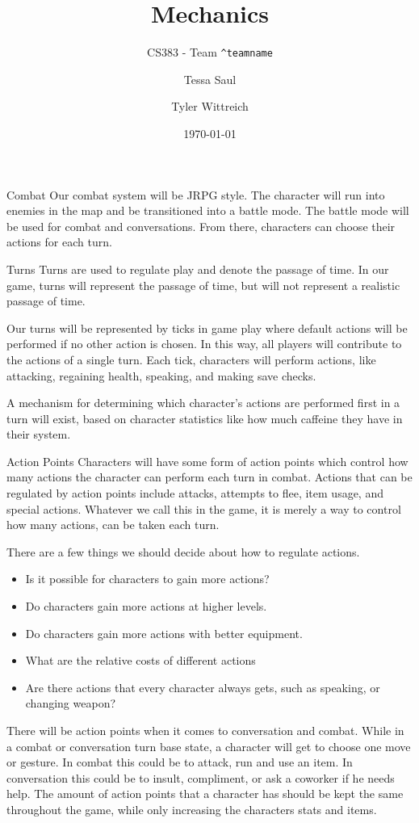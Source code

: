 \documentclass[12pt]{article}
\title{Mechanics}
\subtitle{CS383 - Team \texttt{\textasciicircum teamname}}
\date{\today}
\author{
Tessa Saul
\and Tyler Wittreich
}
\begin{document}
\maketitle

\begin{section}{Combat}
Our combat system will be JRPG style.  The character will run into enemies in
the map and be transitioned
into a battle mode. The battle mode will be used for combat and conversations.
From there, characters can choose their actions for each turn.
\end{section}

\begin{section}{Turns}
Turns are used to regulate play and denote the passage of time.  In our game,
turns will represent the passage of time, but will not represent a realistic
passage of time.

Our turns will be represented by ticks in game play where default
actions will be performed if no other action is chosen.  In this way, all
players will contribute to the actions of a single turn. Each tick, characters
will perform actions, like attacking,
regaining health, speaking, and making save checks.

A mechanism for determining which character's actions are performed
first in a turn will exist, based on character statistics like how much
caffeine they have in their system.
\end{section}

\begin{section}{Action Points}
Characters will have some form of action points which control how many actions
the character can perform each turn in combat. Actions
that can be regulated by action points include attacks, attempts to flee, item
usage, and special actions.  Whatever we call this in the game, it is merely a
way to control how many actions, can be taken each turn.

There are a few things we should decide about how to regulate actions.
\begin{itemize}
\item Is it possible for characters to gain more actions?
\item Do characters gain more actions at higher levels.
\item Do characters gain more actions with better equipment.
\item What are the relative costs of different actions
\item Are there actions that every character always gets, such as speaking, or changing weapon?
\end{itemize}

There will be action points when it comes to conversation and combat.
While in a combat or conversation turn base state, a character will get to
choose one move or gesture. In combat this could be to attack, run and use an
item. In conversation this could be to insult, compliment, or ask a coworker if
he needs help. The amount of action points that a character has should be kept
the same throughout the game, while only increasing the characters stats and
items.
\end{section}
\end{document}
